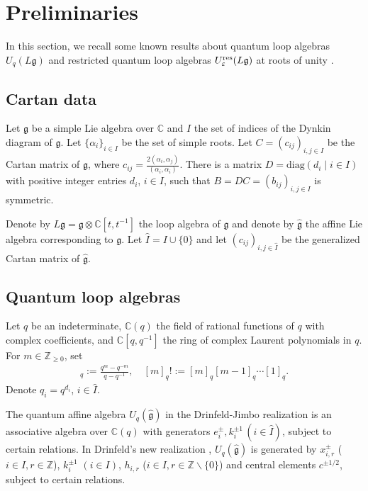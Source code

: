 \documentclass[12pt, reqno]{amsart}
\numberwithin{equation}{section}
\newcommand{\res}{{\rm res}}
\begin{document}
\section{Preliminaries}\label{Preliminaries}
In this section, we recall some known results about quantum loop algebras $U_q({L\mathfrak{g}})$ and restricted quantum loop algebras $U_\varepsilon^{\res}({L\mathfrak{g}})$ at roots of unity \cite{CP97b, FM02}.

\subsection{Cartan data}\label{cartan data}
Let $\mathfrak{g}$ be a simple Lie algebra over $\mathbb{C}$ and $I$ the set of indices of the Dynkin diagram of $\mathfrak{g}$. Let $\{\alpha_i\}_{i \in I}$ be the set of simple roots. Let $C=(c_{ij})_{i,j \in I}$ be the Cartan matrix of $\mathfrak{g}$, where $c_{ij}=\frac{2 (\alpha_i, \alpha_j) }{(\alpha_i, \alpha_i)}$. There is a matrix $D=\text{diag}(d_{i}\mid i\in I)$ with positive integer entries $d_i$, $i\in I$, such that $B=DC=(b_{ij})_{i,j \in I}$ is symmetric.

Denote by $L\mathfrak{g}= \mathfrak{g}\otimes\mathbb{C}[t,t^{-1}]$ the loop algebra of $\mathfrak{g}$ and denote by $\widehat{\mathfrak{g}}$ the affine Lie algebra corresponding to $\mathfrak{g}$. Let $\hat{I}=I\cup\{0\}$ and let $(c_{ij})_{i,j \in \hat{I}}$ be the generalized Cartan matrix of $\widehat{\mathfrak{g}}$.

\subsection{Quantum loop algebras}\label{definition of quantum affine algebras}

Let $q$ be an indeterminate, $\mathbb{C}(q)$ the field of rational functions of $q$ with complex coefficients, and $\mathbb{C} [q,q^{-1}]$ the ring of complex Laurent polynomials in $q$. For $m \in \mathbb{Z}_{\geq 0}$, set
\begin{align*}
[m]_{q} := \frac{q^m-q^{-m}}{q-q^{-1}},\quad  [m]_{q} ! := [m]_{q}[m-1]_{q} \cdots [1]_{q}.
\end{align*}
Denote $q_i=q^{d_i}$, $i \in \hat{I}$.

The quantum affine algebra $U_q(\widehat{\mathfrak{g}})$ in the Drinfeld-Jimbo realization \cite{Dri85, Jim85} is an associative algebra over $\mathbb{C}(q)$ with generators $e_i^{\pm}, k_i^{\pm 1}\,(i \in \hat{I})$, subject to certain relations. In Drinfeld's new realization \cite{Dri88}, $U_q(\widehat{\mathfrak{g}})$ is generated by $x_{i, r}^{\pm}$ ($i \in I, r \in \mathbb{Z}$), $k_i^{\pm 1}$ $(i \in I)$, $h_{i, r}$ ($i \in I, r \in \mathbb{Z}\backslash \{0\}$) and central elements $c^{\pm 1/2}$, subject to certain relations.
\end{document}
